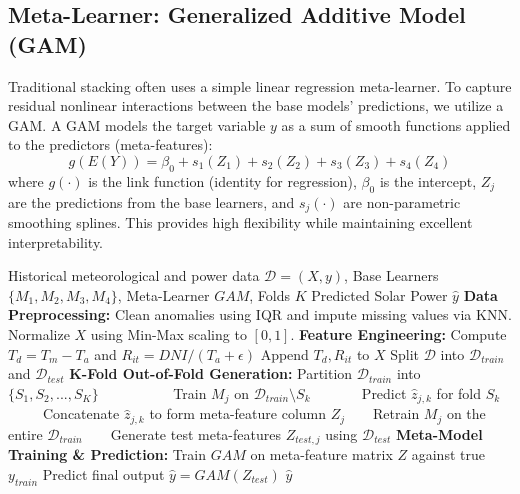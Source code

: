 \documentclass[conference]{IEEEtran}
\begin{document}
\subsection{Meta-Learner: Generalized Additive Model (GAM)}
Traditional stacking often uses a simple linear regression meta-learner. To capture residual nonlinear interactions between the base models' predictions, we utilize a GAM. A GAM models the target variable $y$ as a sum of smooth functions applied to the predictors (meta-features):
\begin{equation}
g(E(Y)) = \beta_0 + s_1(Z_1) + s_2(Z_2) + s_3(Z_3) + s_4(Z_4)
\end{equation}
where $g(\cdot)$ is the link function (identity for regression), $\beta_0$ is the intercept, $Z_j$ are the predictions from the base learners, and $s_j(\cdot)$ are non-parametric smoothing splines. This provides high flexibility while maintaining excellent interpretability.


\begin{algorithm}[H]
\caption{EnsGAM-Improved: K-Fold Stacking Framework}
\label{alg:ensgam}
\begin{algorithmic}[1]
\renewcommand{\algorithmicrequire}{\textbf{Input:}}
\renewcommand{\algorithmicensure}{\textbf{Output:}}
\REQUIRE Historical meteorological and power data $\mathcal{D} = (X, y)$, Base Learners $\{M_1, M_2, M_3, M_4\}$, Meta-Learner $GAM$, Folds $K$
\ENSURE Predicted Solar Power $\hat{y}$
\STATE \textbf{Data Preprocessing:}
\STATE Clean anomalies using IQR and impute missing values via KNN.
\STATE Normalize $X$ using Min-Max scaling to $[0, 1]$.
\STATE \textbf{Feature Engineering:}
\STATE Compute $T_d = T_m - T_a$ and $R_{it} = DNI / (T_a + \epsilon)$
\STATE Append $T_d, R_{it}$ to $X$
\STATE Split $\mathcal{D}$ into $\mathcal{D}_{train}$ and $\mathcal{D}_{test}$
\STATE \textbf{K-Fold Out-of-Fold Generation:}
\STATE Partition $\mathcal{D}_{train}$ into $\{S_1, S_2, ..., S_K\}$
        \STATE Train $M_j$ on $\mathcal{D}_{train} \setminus S_k$
        \STATE Predict $\hat{z}_{j,k}$ for fold $S_k$
    \ENDFOR
    \STATE Concatenate $\hat{z}_{j,k}$ to form meta-feature column $Z_j$
    \STATE Retrain $M_j$ on the entire $\mathcal{D}_{train}$
    \STATE Generate test meta-features $Z_{test, j}$ using $\mathcal{D}_{test}$
\ENDFOR
\STATE \textbf{Meta-Model Training \& Prediction:}
\STATE Train $GAM$ on meta-feature matrix $Z$ against true $y_{train}$
\STATE Predict final output $\hat{y} = GAM(Z_{test})$
\RETURN $\hat{y}$
\end{algorithmic}
\end{algorithm}
\end{document}
